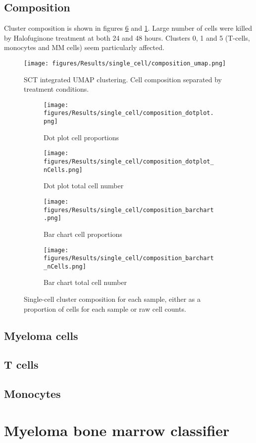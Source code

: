 \subsection{Composition}
Cluster composition is shown in figures \ref{fig:sc_comp_clusters} and \ref{fig:sc_umap_comp}.
Large number of cells were killed by Halofuginone treatment at both 24 and 48 hours.
Clusters 0, 1 and 5 (T-cells, monocytes and MM cells) seem particularly affected.

\begin{figure}[htb]
\centering
\texttt{[image: figures/Results/single\_cell/composition\_umap.png]}
\caption[UMAP cluster composition]{SCT integrated UMAP clustering. Cell composition separated by treatment conditions. }
\label{fig:sc_umap_comp}
\end{figure}


\begin{figure}[pt]
\begin{subfigure}[t]{0.5\textwidth}
    \texttt{[image: figures/Results/single\_cell/composition\_dotplot.png]}
    \caption{Dot plot cell proportions}
    \label{fig:comp_dot}
\end{subfigure}
\begin{subfigure}[t]{0.5\textwidth}
    \texttt{[image: figures/Results/single\_cell/composition\_dotplot\_nCells.png]}
    \caption{Dot plot total cell number}
    \label{fig:comp_dot_ncells}
\end{subfigure}
%
\medskip
\begin{subfigure}[t]{0.5\textwidth}
    \texttt{[image: figures/Results/single\_cell/composition\_barchart.png]}
    \caption{Bar chart cell proportions}
    \label{fig:comp_bar}
\end{subfigure}
\begin{subfigure}[t]{0.5\textwidth}
    \texttt{[image: figures/Results/single\_cell/composition\_barchart\_nCells.png]}
    \caption{Bar chart total cell number}
    \label{fig:comp_bar_ncells}
\end{subfigure}
%
\caption[Single-cell cluster composition]{Single-cell cluster composition for each sample, either as a proportion of cells for each sample or raw cell counts.}
\label{fig:sc_comp_clusters}
\end{figure}


\subsection{Myeloma cells}

\subsection{T cells}

\subsection{Monocytes}


\section{Myeloma bone marrow classifier}